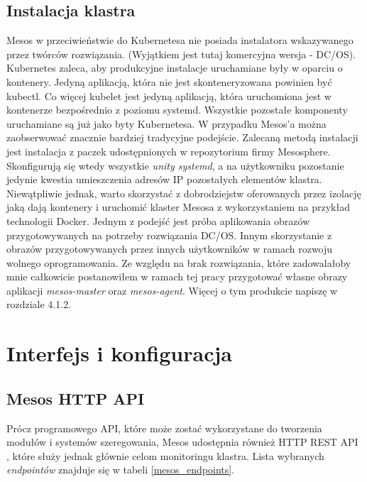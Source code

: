\documentclass[10pt,a4paper,titlepage,twoside]{report}
\begin{document}
\subsection{Instalacja klastra}
Mesos \cite{ad33} \cite{ad34} w przeciwieństwie do Kubernetesa nie posiada instalatora wskazywanego przez twórców rozwiązania. (Wyjątkiem jest tutaj komercyjna wersja - DC/OS). Kubernetes zaleca, aby produkcyjne instalacje uruchamiane były w oparciu o kontenery. Jedyną aplikacją, która nie jest skonteneryzowana powinien być kubectl. Co więcej kubelet jest jedyną aplikacją, która uruchomiona jest w kontenerze bezpośrednio z poziomu systemd. Wszystkie pozostałe komponenty uruchamiane są już jako byty Kubernetesa. W przypadku Mesos'a można zaobserwować znacznie bardziej tradycyjne podejście. Zalecaną metodą instalacji jest instalacja z paczek udostępnionych w repozytorium firmy Mesosphere. Skonfigurują się wtedy wszystkie \textit{unity systemd}, a na użytkowniku pozostanie jedynie kwestia umieszczenia adresów IP pozostałych elementów klastra. Niewątpliwie jednak, warto skorzystać z dobrodziejstw oferowanych przez izolację jaką dają kontenery i uruchomić klaster Mesosa z wykorzystaniem na przykład technologii Docker. Jednym z podejść jest próba aplikowania obrazów przygotowywanych na potrzeby rozwiązania DC/OS. Innym skorzystanie z obrazów przygotowywanych przez innych użytkowników w ramach rozwoju wolnego oprogramowania. Ze względu na brak rozwiązania, które zadowalałoby mnie całkowicie postanowiłem w ramach tej pracy przygotować własne obrazy aplikacji \textit{mesos-master} oraz \textit{mesos-agent}. Więcej o tym produkcie napiszę w rozdziale 4.1.2.

\section{Interfejs i konfiguracja}
\subsection{Mesos HTTP API}
Prócz programowego API, które może zostać wykorzystane do tworzenia modułów i systemów szeregowania, Mesos udostępnia również HTTP REST API \cite{ad38}, które służy jednak głównie celom monitoringu klastra. Lista wybranych \textit{endpointów} znajduje się w tabeli \ref{mesos_endpoints}.
\end{document}
